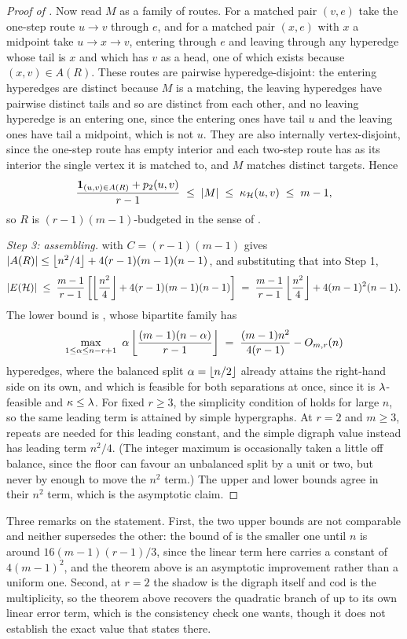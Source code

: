 \begin{proof}[Proof of ]
Now read $M$ as a family of routes. For a matched pair $(v, e)$ take the one-step
route $u \to v$ through $e$, and for a matched pair $(x, e)$ with $x$ a midpoint
take $u \to x \to v$, entering through $e$ and leaving through any hyperedge
whose tail is $x$ and which has $v$ as a head, one of which exists because
$(x,v) \in A(R)$. These routes are pairwise hyperedge-disjoint: the entering
hyperedges are distinct because $M$ is a matching, the leaving hyperedges have
pairwise distinct tails and so are distinct from each other, and no leaving
hyperedge is an entering one, since the entering ones have tail $u$ and the
leaving ones have tail a midpoint, which is not $u$. They are also internally
vertex-disjoint, since the one-step route has empty interior and each two-step
route has as its interior the single vertex it is matched to, and $M$ matches
distinct targets. Hence
\[
    \frac{\mathbf{1}_{(u,v) \in A(R)} + p_2(u,v)}{r-1}
    \;\le\; |M| \;\le\; \kappa_{\mathcal{H}}(u,v) \;\le\; m-1 ,
\]
so $R$ is $(r-1)(m-1)$-budgeted in the sense of .

\emph{Step 3: assembling.}  with $C = (r-1)(m-1)$ gives
$|A(R)| \le \left\lfloor n^2/4 \right\rfloor + 4(r-1)(m-1)(n-1)$, and substituting that into Step 1,
\[
    |E(\mathcal{H})| \;\le\; \frac{m-1}{r-1}\left[\left\lfloor \frac{n^2}{4} \right\rfloor + 4(r-1)(m-1)(n-1)\right]
    \;=\; \frac{m-1}{r-1}\left\lfloor \frac{n^2}{4} \right\rfloor + 4(m-1)^2(n-1).
\]
The lower bound is , whose bipartite family has
\[
    \max_{1\le\alpha\le n-r+1} \ \alpha \left\lfloor \frac{(m-1)(n-\alpha)}{r-1} \right\rfloor
    \;=\; \frac{(m-1)n^2}{4(r-1)} - O_{m,r}(n)
\]
hyperedges, where the balanced split $\alpha = \left\lfloor n/2 \right\rfloor$ already attains the
right-hand side on its own, and which is feasible for both separations at once,
since it is $\lambda$-feasible and $\kappa \le \lambda$. For fixed $r\ge3$, the simplicity condition of  holds for large $n$, so the same leading term is attained by simple hypergraphs. At $r=2$ and $m\ge3$, repeats are needed for this leading constant, and the simple digraph value instead has leading term $n^2/4$. (The integer maximum is
occasionally taken a little off balance, since the floor can favour an
unbalanced split by a unit or two, but never by enough to move the $n^2$ term.) The upper and
lower bounds agree in their $n^2$ term, which is the asymptotic claim.
\end{proof}

Three remarks on the statement. First, the two upper bounds are not comparable
and neither supersedes the other: the bound of  is the
smaller one until $n$ is around $16(m-1)(r-1)/3$, since the linear term here
carries a constant of $4(m-1)^2$, and the theorem above is an asymptotic
improvement rather than a uniform one. Second, at $r = 2$ the shadow is the
digraph itself and $\mathrm{cod}$ is the multiplicity, so the theorem above
recovers the quadratic branch of  up to its own linear
error term, which is the consistency check one wants, though it does not
establish the exact value that  states there.

